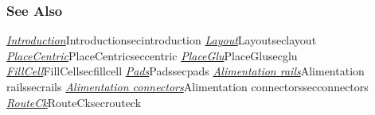 \begin{htmlonly}
         
\subsubsection{See Also}

\hyperref[ref]{\emph{Introduction}}{}{Introduction}{secintroduction}
\hyperref[ref]{\emph{Layout}}{}{Layout}{seclayout}
\hyperref[ref]{\emph{PlaceCentric}}{}{PlaceCentric}{seccentric}
\hyperref[ref]{\emph{PlaceGlu}}{}{PlaceGlu}{secglu}
\hyperref[ref]{\emph{FillCell}}{}{FillCell}{secfillcell}
\hyperref[ref]{\emph{Pads}}{}{Pads}{secpads}
\hyperref[ref]{\emph{Alimentation rails}}{}{Alimentation rails}{secrails}
\hyperref[ref]{\emph{Alimentation connectors}}{}{Alimentation connectors}{secconnectors}
\hyperref[ref]{\emph{RouteCk}}{}{RouteCk}{secrouteck}

\end{htmlonly}

